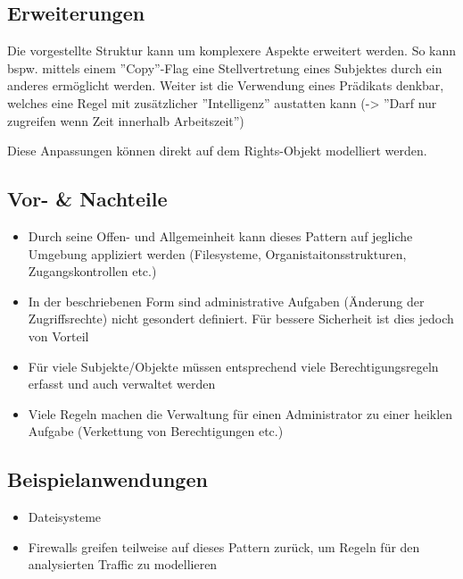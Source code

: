 \subsection*{Erweiterungen}
Die vorgestellte Struktur kann um komplexere Aspekte erweitert werden. So kann bspw. mittels einem ''Copy''-Flag eine Stellvertretung eines Subjektes durch ein anderes ermöglicht werden.
Weiter ist die Verwendung eines Prädikats denkbar, welches eine Regel mit zusätzlicher ''Intelligenz'' austatten kann (-> ''Darf nur zugreifen wenn Zeit innerhalb Arbeitszeit'')

Diese Anpassungen können direkt auf dem Rights-Objekt modelliert werden.

\subsection*{Vor- \& Nachteile}
\begin{itemize}
	\item Durch seine Offen- und Allgemeinheit kann dieses Pattern auf jegliche Umgebung appliziert werden (Filesysteme, Organistaitonsstrukturen, Zugangskontrollen etc.)
	\item In der beschriebenen Form sind administrative Aufgaben (Änderung der Zugriffsrechte) nicht gesondert definiert. Für bessere Sicherheit ist dies jedoch von Vorteil
	\item Für viele Subjekte/Objekte müssen entsprechend viele Berechtigungsregeln erfasst und auch verwaltet werden
	\item Viele Regeln machen die Verwaltung für einen Administrator zu einer heiklen Aufgabe (Verkettung von Berechtigungen etc.)
\end{itemize}

\subsection*{Beispielanwendungen}
\begin{itemize}
	\item Dateisysteme
	\item Firewalls greifen teilweise auf dieses Pattern zurück, um Regeln für den analysierten Traffic zu modellieren
\end{itemize}